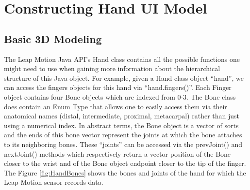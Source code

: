 \chapter{Constructing Hand UI Model}

\label{Chapter2} 

\section{Basic 3D Modeling}
The Leap Motion Java API’s Hand class contains all the possible functions one might need to use when gaining more information about the hierarchical structure of this Java object. For example, given a Hand class object “hand”, we can access the fingers objects for this hand via “hand.fingers()”.  Each Finger object contains four Bone objects which are indexed from 0-3. The Bone class does contain an Enum Type that allows one to easily access them via their anatomical names (distal, intermediate, proximal, metacarpal) rather than just using a numerical index. In abstract terms, the Bone object is a vector of sorts and the ends of this bone vector represent the joints at which the bone attaches to its neighboring bones. These “joints” can be accessed via the prevJoint() and nextJoint() methods which respectively return a vector position of the Bone closer to the wrist and of the Bone object endpoint closer to the tip of the finger. The Figure \ref{fig:HandBones} shows the bones and joints of the hand for which the Leap Motion sensor records data.  


